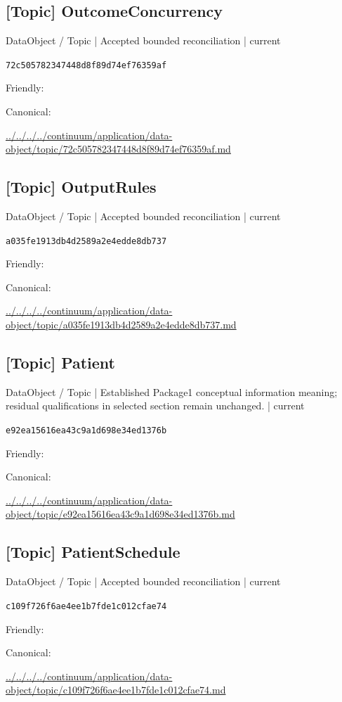 \documentclass[10pt,a4paper]{article}
\begin{document}
\subsection*{[Topic] OutcomeConcurrency}
{\small DataObject / Topic | Accepted bounded reconciliation | current}\par
\texttt{72c505782347448d8f89d74ef76359af}\par
Friendly: \par
Canonical: \par
{\footnotesize\url{../../../../continuum/application/data-object/topic/72c505782347448d8f89d74ef76359af.md}}\par
\subsection*{[Topic] OutputRules}
{\small DataObject / Topic | Accepted bounded reconciliation | current}\par
\texttt{a035fe1913db4d2589a2e4edde8db737}\par
Friendly: \par
Canonical: \par
{\footnotesize\url{../../../../continuum/application/data-object/topic/a035fe1913db4d2589a2e4edde8db737.md}}\par
\subsection*{[Topic] Patient}
{\small DataObject / Topic | Established Package1 conceptual information meaning; residual qualifications in selected section remain unchanged. | current}\par
\texttt{e92ea15616ea43c9a1d698e34ed1376b}\par
Friendly: \par
Canonical: \par
{\footnotesize\url{../../../../continuum/application/data-object/topic/e92ea15616ea43c9a1d698e34ed1376b.md}}\par
\subsection*{[Topic] PatientSchedule}
{\small DataObject / Topic | Accepted bounded reconciliation | current}\par
\texttt{c109f726f6ae4ee1b7fde1c012cfae74}\par
Friendly: \par
Canonical: \par
{\footnotesize\url{../../../../continuum/application/data-object/topic/c109f726f6ae4ee1b7fde1c012cfae74.md}}\par
\end{document}
